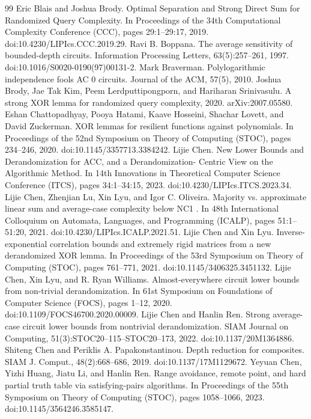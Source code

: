 \documentclass[10pt,a4paper]{article}
\begin{document}
\begin{thebibliography}{99}
 Eric Blais and Joshua Brody. Optimal Separation and Strong Direct Sum for Randomized Query Complexity. In Proceedings of the 34th Computational Complexity Conference (CCC), pages 29:1–29:17, 2019. doi:10.4230/LIPIcs.CCC.2019.29.
 Ravi B. Boppana. The average sensitivity of bounded-depth circuits. Information Processing Letters, 63(5):257–261, 1997. doi:10.1016/S0020-0190(97)00131-2.
 Mark Braverman. Polylogarithmic independence fools AC 0 circuits. Journal of the ACM, 57(5), 2010.
 Joshua Brody, Jae Tak Kim, Peem Lerdputtipongporn, and Hariharan Srinivasulu. A strong XOR lemma for randomized query complexity, 2020. arXiv:2007.05580.
 Eshan Chattopadhyay, Pooya Hatami, Kaave Hosseini, Shachar Lovett, and David Zuckerman. XOR lemmas for resilient functions against polynomials. In Proceedings of the 52nd Symposium on Theory of Computing (STOC), pages 234–246, 2020. doi:10.1145/3357713.3384242.
 Lijie Chen. New Lower Bounds and Derandomization for ACC, and a Derandomization- Centric View on the Algorithmic Method. In 14th Innovations in Theoretical Computer Science Conference (ITCS), pages 34:1–34:15, 2023. doi:10.4230/LIPIcs.ITCS.2023.34.
 Lijie Chen, Zhenjian Lu, Xin Lyu, and Igor C. Oliveira. Majority vs. approximate linear sum and average-case complexity below NC1 . In 48th International Colloquium on Automata, Languages, and Programming (ICALP), pages 51:1–51:20, 2021. doi:10.4230/LIPIcs.ICALP.2021.51.       
 Lijie Chen and Xin Lyu. Inverse-exponential correlation bounds and extremely rigid matrices from a new derandomized XOR lemma. In Proceedings of the 53rd Symposium on Theory of Computing (STOC), pages 761–771, 2021. doi:10.1145/3406325.3451132.
 Lijie Chen, Xin Lyu, and R. Ryan Williams. Almost-everywhere circuit lower bounds from non-trivial derandomization. In 61st Symposium on Foundations of Computer Science (FOCS), pages 1–12, 2020. doi:10.1109/FOCS46700.2020.00009.
 Lijie Chen and Hanlin Ren. Strong average-case circuit lower bounds from nontrivial derandomization. SIAM Journal on Computing, 51(3):STOC20–115–STOC20–173, 2022. doi:10.1137/20M1364886.
 Shiteng Chen and Periklis A. Papakonstantinou. Depth reduction for composites. SIAM J. Comput., 48(2):668–686, 2019. doi:10.1137/17M1129672.
 Yeyuan Chen, Yizhi Huang, Jiatu Li, and Hanlin Ren. Range avoidance, remote point, and hard partial truth table via satisfying-pairs algorithms. In Proceedings of the 55th Symposium on Theory of Computing (STOC), pages 1058–1066, 2023. doi:10.1145/3564246.3585147.

\end{thebibliography}
\end{document}
